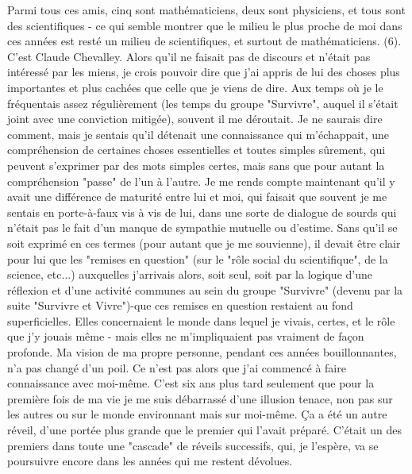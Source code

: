 {Parmi tous ces amis, cinq sont mathématiciens, deux sont physiciens, et tous sont des scientifiques - ce qui semble montrer que le milieu le plus proche de moi dans ces années est resté un milieu de scientifiques, et surtout de mathématiciens.} (6). C'est Claude Chevalley. Alors qu'il ne faisait pas de discours et n'était pas intéressé par les miens, je crois pouvoir dire que j'ai appris de lui des choses plus importantes et plus cachées que celle que je viens de dire. Aux temps où je le fréquentais assez régulièrement (les temps du groupe "Survivre", auquel il s'était joint avec une conviction mitigée), souvent il me déroutait. Je ne saurais dire comment, mais je sentais qu'il détenait une connaissance qui m'échappait, une compréhension de certaines choses essentielles et toutes simples sûrement, qui peuvent s'exprimer par des mots simples certes, mais sans que pour autant la compréhension "passe" de l'un à l'autre. Je me rends compte maintenant qu'il y avait une différence de maturité entre lui et moi, qui faisait que souvent je me sentais en porte-à-faux vis à vis de lui, dans une sorte de dialogue de sourds qui n'était pas le fait d'un manque de sympathie mutuelle ou d'estime. Sans qu'il se soit exprimé en ces termes (pour autant que je me souvienne), il devait être clair pour lui que les "remises en question" (sur le "rôle social du scientifique", de la science, etc...) auxquelles j'arrivais alors, soit seul, soit par la logique d'une réflexion et d'une activité communes au sein du groupe "Survivre" (devenu par la suite "Survivre et Vivre")-que ces remises en question restaient au fond superficielles. Elles concernaient le monde dans lequel je vivais, certes, et le rôle que j'y jouais même - mais elles ne m'impliquaient pas vraiment de façon profonde. Ma vision de ma propre personne, pendant ces années bouillonnantes, n'a pas changé d'un poil. Ce n'est pas alors que j'ai commencé à faire connaissance avec moi-même. C'est six ans plus tard seulement que pour la première fois de ma vie je me suis débarrassé d'une illusion tenace, non pas sur les autres ou sur le monde environnant mais sur moi-même. Ça a été un autre réveil, d'une portée plus grande que le premier qui l'avait préparé. C'était un des premiers dans toute une "cascade" de réveils successifs, qui, je l'espère, va se poursuivre encore dans les années qui me restent dévolues.

